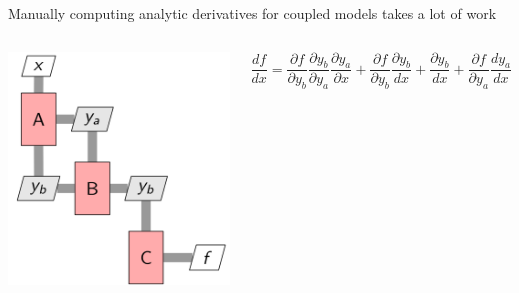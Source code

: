 \documentclass[aspectratio=169, usenames,dvipsnames, 14pt]{beamer}
\begin{document}
\begin{frame}{Manually computing analytic derivatives for coupled models takes a lot of work}
\begin{columns}
        \includegraphics[scale=0.2]{images/slide79.png}

       
       \begin{equation*}
            \frac{df}{dx} = \frac{\partial f}{\partial y_{b}} \frac{\partial y_{b}}{\partial y_{a}} \frac{\partial y_{a}}{\partial x} + \frac{\partial f}{\partial y_{b}} \frac{\partial y_{b}}{dx} + \frac{\partial y_{b}}{dx} + \frac{\partial f}{\partial y_{a}} \frac{dy_{a}}{dx}
        \end{equation*}
\end{columns}
    
\end{frame}

\end{document}
